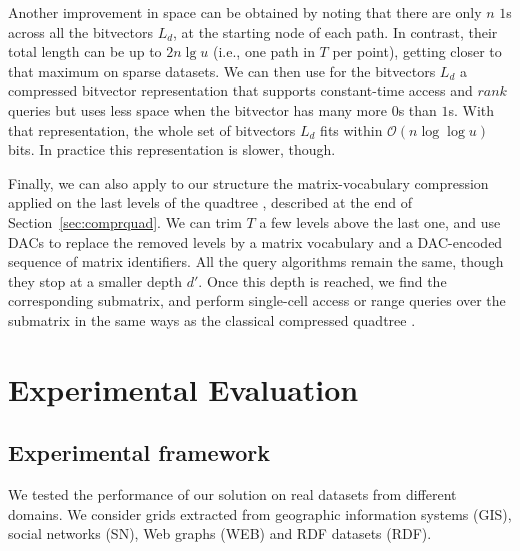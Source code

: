 \documentclass{elsarticle}
\newcommand{\Oh}[1]
  {\ensuremath{\mathcal{O}\!\left( {#1} \right)}}
\begin{document}
Another improvement in space can be obtained by noting that there are only $n$ $1$s across all the bitvectors $L_d$, at the starting node of each path. In contrast, their total length can be up to $2n\lg u$ (i.e., one path in $T$ per point), getting closer to that maximum on sparse datasets. We can then use for the bitvectors $L_d$ a compressed bitvector representation \cite{RRR} that supports constant-time access and $rank$ queries but uses less space when the bitvector has many more $0$s than $1$s. With that representation, the whole set of bitvectors $L_d$ fits within $\Oh{n\log\log u}$ bits. In practice this representation is slower, though.

Finally, we can also apply to our structure the matrix-vocabulary compression applied on the last levels of the quadtree \cite{BLN14}, described at the end of  Section~\ref{sec:comprquad}. We can trim $T$ a few levels above the last one, and use DACs to replace the removed levels by a matrix vocabulary and a DAC-encoded sequence of matrix identifiers. All the query algorithms remain the same, though they stop at a smaller depth $d'$. Once this depth is reached, we find the corresponding submatrix, and perform single-cell access or range queries over the submatrix in the same ways as the classical compressed quadtree \cite{BLN14}.

\section{Experimental Evaluation}
\label{sec:experiments}

\subsection{Experimental framework}

We tested the performance of our solution on real datasets from different domains. We consider grids extracted from geographic information systems (GIS), social networks (SN), Web graphs (WEB) and RDF datasets (RDF). 
\end{document}
